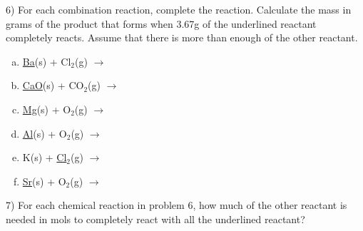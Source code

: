 \documentclass[12pt]{article}
\begin{document}
6) For each combination reaction, complete the reaction.
Calculate the mass in grams of the product
that forms when 3.67g of the underlined reactant completely reacts.
Assume that there is more than enough of the other reactant.

\begin{enumerate}[(a)]
\item \underline{Ba}(s) + Cl$_2$(g) $\rightarrow$ %
\item \underline{CaO}(s) + CO$_2$(g) $\rightarrow$ %
\item \underline{Mg}(s) + O$_2$(g) $\rightarrow$ %
\item \underline{Al}(s) + O$_2$(g) $\rightarrow$ %
\item K(s) + \underline{Cl$_2$}(g) $\rightarrow$ %
\item \underline{Sr}(s) + O$_2$(g) $\rightarrow$ %
\end{enumerate}

7) For each chemical reaction in problem 6, how much of the other
reactant is needed in mols to completely react with all the underlined
reactant?
  
\end{document}
